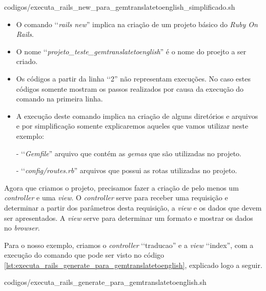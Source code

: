 
{codigos/executa_rails_new_para_gemtranslatetoenglish_simplificado.sh}

\begin{itemize}

 \item O comando ‘‘\emph{rails new}'' implica na criação de um projeto básico do \emph{Ruby On Rails}.

 \item O nome ‘‘\emph{projeto\_teste\_gemtranslatetoenglish}'' é o nome do proejto a ser criado.

  \item Os códigos a partir da linha ‘‘2'' não representam execuções. No caso estes códigos somente
 mostram os passos realizados por causa da execução do comando na primeira linha.

 \item A execução deste comando implica na criação de alguns diretórios e arquivos e por simplificação
 somente explicaremos aqueles que vamos utilizar neste exemplo:

  \subitem - ‘‘\emph{Gemfile}'' arquivo que contém as \emph{gemas} que são utilizadas no projeto.

  \subitem - ‘‘\emph{config/routes.rb}'' arquivos que possui as rotas utilizadas no projeto.

\end{itemize}

Agora que criamos o projeto, precisamos fazer a criação de pelo menos um \emph{controller} e uma \emph{view}.
O \emph{controller} serve para receber uma requisição e determinar a partir dos parâmetros desta
requisição, a \emph{view} e os dados que devem ser apresentados. A \emph{view} serve para
determinar um formato e mostrar os dados no \emph{browser}.

Para o nosso exemplo, criamos o \emph{controller} ‘‘traducao'' e a \emph{view} ‘‘index'', com a execução do
comando que pode ser visto no código \ref{lst:executa_rails_generate_para_gemtranslatetoenglish},
explicado logo a seguir.


{codigos/executa_rails_generate_para_gemtranslatetoenglish.sh}

